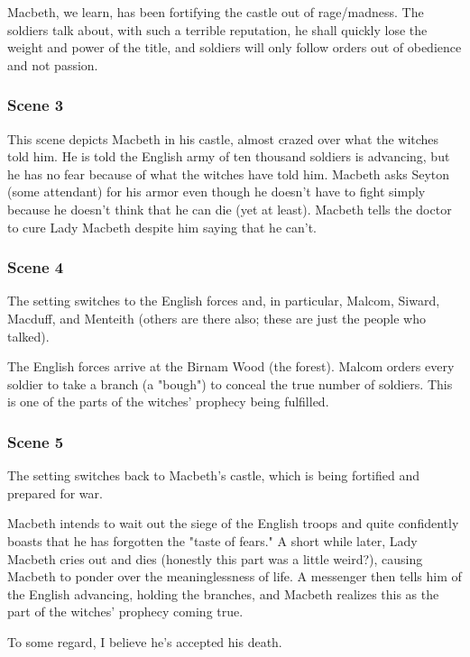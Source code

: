 Macbeth, we learn, has been fortifying the castle out of rage/madness. The
soldiers talk about, with such a terrible reputation, he shall quickly lose the
weight and power of the title, and soldiers will only follow orders out of
obedience and not passion.

\subsubsection{Scene 3}

This scene depicts Macbeth in his castle, almost crazed over what the witches
told him. He is told the English army of ten thousand soldiers is advancing,
but he has no fear because of what the witches have told him. Macbeth asks
Seyton (some attendant) for his armor even though he doesn't have to fight
simply because he doesn't think that he can die (yet at least). Macbeth tells
the doctor to cure Lady Macbeth despite him saying that he can't.

\subsubsection{Scene 4}

The setting switches to the English forces and, in particular, Malcom, Siward,
Macduff, and Menteith (others are there also; these are just the people who
talked).

The English forces arrive at the Birnam Wood (the forest). Malcom orders every
soldier to take a branch (a "bough") to conceal the true number of soldiers.
This is one of the parts of the witches' prophecy being fulfilled.

\subsubsection{Scene 5}

The setting switches back to Macbeth's castle, which is being fortified and prepared for war.

Macbeth intends to wait out the siege of the English troops and quite
confidently boasts that he has forgotten the "taste of fears." A short while
later, Lady Macbeth cries out and dies (honestly this part was a little
weird?), causing Macbeth to ponder over the meaninglessness of life. A
messenger then tells him of the English advancing, holding the branches, and
Macbeth realizes this as the part of the witches' prophecy coming true.

To some regard, I believe he's accepted his death.


